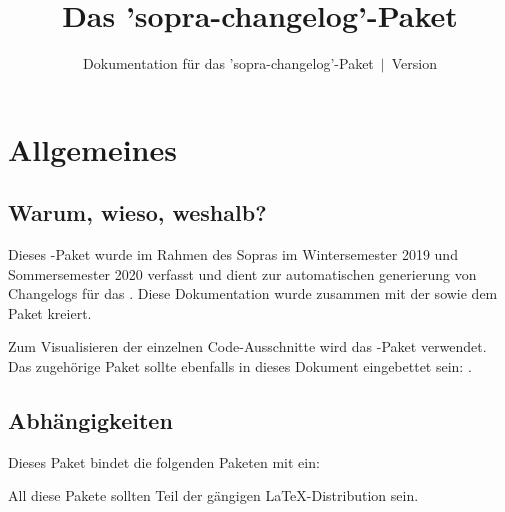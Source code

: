 \documentclass{sopra-base}
\title{Das 'sopra-changelog'-Paket}
\subtitle[Dokumentation für das 'sopra-changelog'-Paket]{Dokumentation für das 'sopra-changelog'-Paket~$\mid$~Version \thesocversion}
\begin{document}
    \maketitle%
%
%

%
%
%
%

\section{Allgemeines}
\subsection{Warum, wieso, weshalb?}
    Dieses \LaTeXe-Paket wurde im Rahmen des Sopras im 
    Wintersemester 2019 und Sommersemester 2020 verfasst und dient zur automatischen generierung von Changelogs für das . Diese Dokumentation wurde zusammen mit der 
     sowie dem Paket  kreiert.\par
    Zum Visualisieren der einzelnen Code-Ausschnitte wird das
    -Paket verwendet.
    Das zugehörige Paket sollte ebenfalls in dieses Dokument eingebettet sein: . 
\subsection{Abhängigkeiten}
    Dieses Paket bindet die folgenden Paketen mit ein:
    \begin{multicols}{4}
    \end{multicols}
    All diese Pakete sollten Teil der gängigen \LaTeX-Distribution sein.
\end{document}
